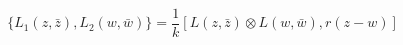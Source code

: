 \begin{equation}
\{L_1(z,\bar{z}),L_2(w,\bar{w})\}=\frac1k[L(z,\bar{z})\otimes L(w,\bar{w}),r(z-w)]
\label{LL}
\end{equation}

